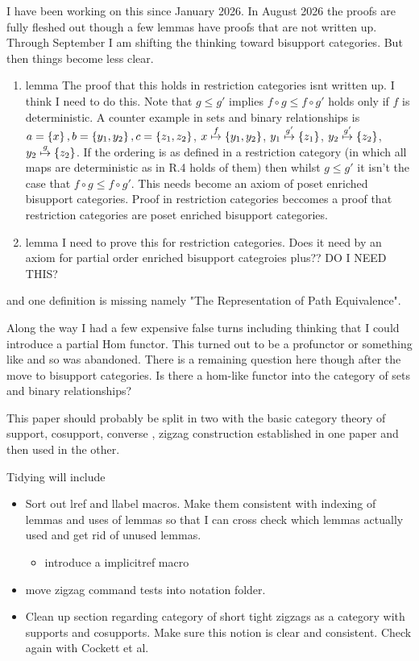 \begin{aside}
I have been working on this since January 2026.
In August 2026 the proofs are fully fleshed out though a few lemmas have proofs that are not written up. Through September I am shifting the thinking toward bisupport categories. But then things become less clear.
\begin{enumerate}
  \item lemma   
  The proof that this holds in restriction categories isnt written up. 
  I think I need to do this. 
  Note that $g \leq g'$ implies $f \circ g \leq f \circ g'$ holds only if $f$ is deterministic. A counter example in sets and binary relationships is
  $a = \left\{x\right\}, b= \left\{y_1,y_2\right\}, c = \left\{z_1,z_2\right\}$, 
  $x \mathrel{\overset{f}{\mapsto}} \left\{y_1,y_2\right\}$,
  $y_1 \mathrel{\overset{g'}{\mapsto}} \left\{z_1\right\}$, 
  $y_2 \mathrel{\overset{g'}{\mapsto}} \left\{z_2\right\}$,
  $y_2 \mathrel{\overset{g}{\mapsto}} \left\{z_2\right\}$.
  If the ordering is as defined in a restriction category (in which all maps are deterministic as in R.4 holds of them) then whilst $g \leq g'$  it isn't the case that $f \circ g \leq f \circ g'$.
  This needs become an axiom of poset enriched bisupport categories. Proof in
  restriction categories beccomes a proof that restriction categories are poset enriched bisupport categories.
  \item lemma 
  I need to prove this for restriction categories. Does it need by an axiom for
  partial order enriched bisupport categroies plus??  DO I NEED THIS?
\end{enumerate}
and one definition is missing namely "The Representation of Path Equivalence".

Along the way I had a few expensive false turns including thinking that I could introduce a partial Hom functor. 
This turned out to be a profunctor or something like and so was abandoned.
There is a remaining question here though after the move to bisupport categories. Is there a hom-like functor into the category of sets and binary relationships?

This paper should probably be split in two with the basic category theory 
of support, cosupport, converse , zigzag construction established in one paper and then used in the other.

Tidying will include
\begin{itemize}
\item Sort out lref and llabel macros. Make them consistent with
indexing of lemmas and uses of lemmas so that I can cross check which lemmas actually used and get rid of unused lemmas.
\begin{itemize}
  \item introduce a implicitref macro
\end{itemize}
\item move zigzag command tests into notation folder.
\item Clean up section regarding category of short tight zigzags as a category with supports and cosupports. Make sure this notion is clear and consistent. Check again with Cockett et al.
\end{itemize}
\end{aside}
